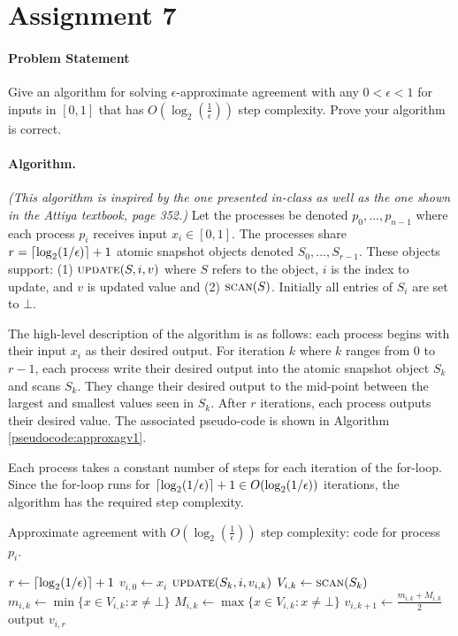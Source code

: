 \documentclass[11pt]{article}
\newcommand\updateF{\textsc{update}}
\newcommand\scanF{\textsc{scan}}
\DeclarePairedDelimiter\ceil{\lceil}{\rceil}
\begin{document}
\rhead{\today}

\section*{Assignment 7}
\paragraph{Problem Statement}
Give an algorithm for solving $\epsilon$-approximate agreement with any $0 < \epsilon < 1$ for inputs in $[0,1]$ that has $O\left(\log_2\left(\frac{1}{\epsilon}\right)\right)$ step complexity. Prove your algorithm is correct.

\paragraph{Algorithm.}
\emph{(This algorithm is inspired by the one presented in-class as well as the one shown in the Attiya textbook, page 352.)} Let the processes be denoted $p_0, ..., p_{n-1}$ where each process $p_i$ receives input $x_i \in [0,1]$. The processes share $r = \ceil{\log_2(1/\epsilon)} + 1$ atomic snapshot objects denoted $S_0, ..., S_{r-1}$. These objects support: (1) $\updateF(S, i, v)$ where $S$ refers to the object, $i$ is the index to update, and $v$ is updated value and (2) $\scanF(S)$. Initially all entries of $S_i$ are set to $\bot$.

The high-level description of the algorithm is as follows: each process begins with their input $x_i$ as their desired output. For iteration $k$ where $k$ ranges from $0$ to $r-1$, each process write their desired output into the atomic snapshot object $S_k$ and scans $S_k$. They change their desired output to the mid-point between the largest and smallest values seen in $S_k$. After $r$ iterations, each process outputs their desired value. The associated pseudo-code is shown in Algorithm \ref{pseudocode:approxagv1}. 

Each process takes a constant number of steps for each iteration of the for-loop. Since the for-loop runs for $\ceil{\log_2(1/\epsilon)} + 1 \in O(\log_2(1/\epsilon))$ iterations, the algorithm has the required step complexity.

\begin{algorithm}
	\caption{Approximate agreement with $O\left(\log_2\left(\frac{1}{\epsilon}\right)\right)$ step complexity: code for process $p_i$.}
    \label{pseudocode:approxagv1}
    \begin{algorithmic}[1]
    \State $r \leftarrow \ceil{\log_2(1/\epsilon)}+1$
	\State $v_{i,0} \leftarrow x_i$
		\State $\updateF(S_k, i, v_{i,k})$
		\State $V_{i,k} \leftarrow \scanF(S_k)$		
		\State $m_{i,k} \leftarrow \min\{x \in V_{i,k}: x \neq \bot\}$
		\State $M_{i,k} \leftarrow \max\{x \in V_{i,k}: x \neq \bot\}$
		\State $v_{i,k+1} \leftarrow \frac{m_{i,k} + M_{i,k}}{2}$
	\EndFor
	\State output $v_{i,r}$
	\end{algorithmic}
\end{algorithm}
\end{document}
